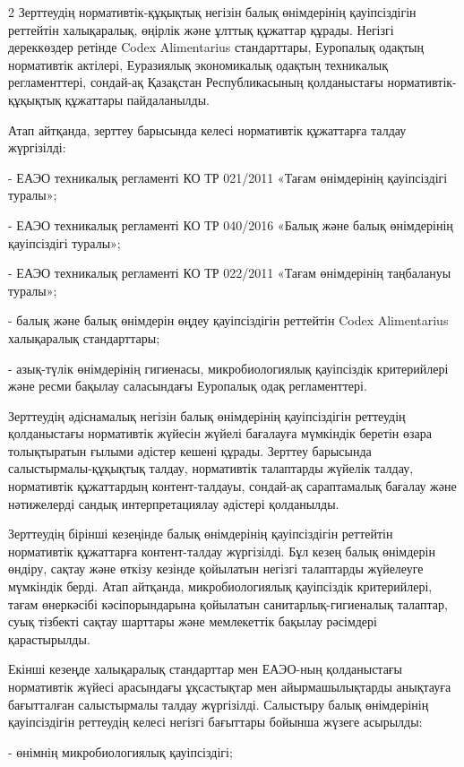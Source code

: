 \begin{multicols}{2}
Зерттеудің нормативтік-құқықтық негізін балық өнімдерінің қауіпсіздігін
реттейтін халықаралық, өңірлік және ұлттық құжаттар құрады. Негізгі
дереккөздер ретінде Codex Alimentarius стандарттары, Еуропалық одақтың
нормативтік актілері, Еуразиялық экономикалық одақтың техникалық
регламенттері, сондай-ақ Қазақстан Республикасының қолданыстағы
нормативтік-құқықтық құжаттары пайдаланылды.

Атап айтқанда, зерттеу барысында келесі нормативтік құжаттарға талдау
жүргізілді:

- ЕАЭО техникалық регламенті КО ТР 021/2011 «Тағам өнімдерінің
қауіпсіздігі туралы»;

- ЕАЭО техникалық регламенті КО ТР 040/2016 «Балық және балық
өнімдерінің қауіпсіздігі туралы»;

- ЕАЭО техникалық регламенті КО ТР 022/2011 «Тағам өнімдерінің
таңбалануы туралы»;

- балық және балық өнімдерін өңдеу қауіпсіздігін реттейтін Codex
Alimentarius халықаралық стандарттары;

- азық-түлік өнімдерінің гигиенасы, микробиологиялық қауіпсіздік
критерийлері және ресми бақылау саласындағы Еуропалық одақ
регламенттері.

Зерттеудің әдіснамалық негізін балық өнімдерінің қауіпсіздігін реттеудің
қолданыстағы нормативтік жүйесін жүйелі бағалауға мүмкіндік беретін
өзара толықтыратын ғылыми әдістер кешені құрады. Зерттеу барысында
салыстырмалы-құқықтық талдау, нормативтік талаптарды жүйелік талдау,
нормативтік құжаттардың контент-талдауы, сондай-ақ сараптамалық бағалау
және нәтижелерді сандық интерпретациялау әдістері қолданылды.

Зерттеудің бірінші кезеңінде балық өнімдерінің қауіпсіздігін реттейтін
нормативтік құжаттарға контент-талдау жүргізілді. Бұл кезең балық
өнімдерін өндіру, сақтау және өткізу кезінде қойылатын негізгі
талаптарды жүйелеуге мүмкіндік берді. Атап айтқанда, микробиологиялық
қауіпсіздік критерийлері, тағам өнеркәсібі кәсіпорындарына қойылатын
санитарлық-гигиеналық талаптар, суық тізбекті сақтау шарттары және
мемлекеттік бақылау рәсімдері қарастырылды.

Екінші кезеңде халықаралық стандарттар мен ЕАЭО-ның қолданыстағы
нормативтік жүйесі арасындағы ұқсастықтар мен айырмашылықтарды анықтауға
бағытталған салыстырмалы талдау жүргізілді. Салыстыру балық өнімдерінің
қауіпсіздігін реттеудің келесі негізгі бағыттары бойынша жүзеге
асырылды:

- өнімнің микробиологиялық қауіпсіздігі;


\end{multicols}
